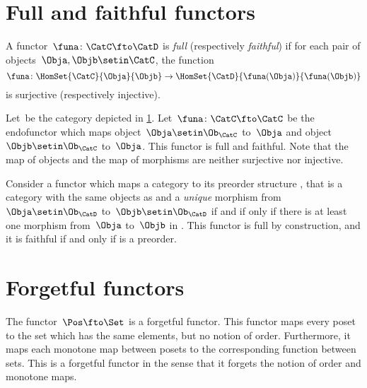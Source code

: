 
\section{Full and faithful functors}

\begin{ctdefinition}
    \label{def:functorfullfaith}
    A functor~$\funa\colon \CatC \fto \CatD$ is \emph{full} (respectively \emph{faithful}) if for each pair of objects~$\Obja,\Objb\setin \CatC$, the function
    \begin{equation}
        \funa \colon \HomSet{\CatC}{\Obja}{\Objb} \to \HomSet{\CatD}{\funa(\Obja)}{\funa(\Objb)}
    \end{equation}
    is surjective (respectively injective).
\end{ctdefinition}

\begin{example}
    Let~\CatC be the category depicted in \cref{fig:ex_full_faithful_1}.
    Let~$\funa\colon \CatC \fto \CatC$ be the endofunctor which maps object~$\Obja\setin \Ob_{\CatC}$ to~$\Obja$ and object~$\Objb\setin \Ob_{\CatC}$ to~$\Obja$.
    This functor is full and faithful.
    Note that the map of objects and the map of morphisms are neither surjective nor injective.

    \begin{figure}[h!]
        \centering
        \caption{}
        \label{fig:ex_full_faithful_1}
    \end{figure}
\end{example}

\begin{example}
    Consider a functor which maps a category \CatC to its preorder structure \CatD, that is a category with the same objects as \CatC and a \emph{unique} morphism from~$\Obja\setin \Ob_\CatD$ to~$\Objb\setin \Ob_\CatD$ if and if only if there is at least one morphism from~$\Obja$ to~$\Objb$ in \CatC.
    This functor is full by construction, and it is faithful if and only if \CatC is a preorder.
\end{example}

\section{Forgetful functors}


\begin{example}
    The functor~$\Pos \fto \Set$ is a forgetful functor.
    This functor maps every poset to the set which has the same elements, but no notion of order.
    Furthermore, it maps each monotone map between posets to the corresponding function between sets.
    This is a forgetful functor in the sense that it forgets the notion of order and monotone maps.
\end{example}
